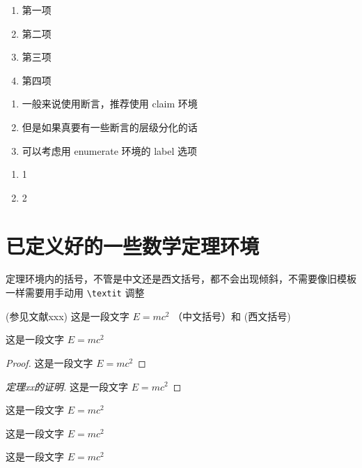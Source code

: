 \begin{enumerate}[I]
  \item 第一项
  \item 第二项
  \item 第三项
  \item 第四项
\end{enumerate}

\begin{enumerate}[label = \textbf{断言} \Alph*]
  \item 一般来说使用断言，推荐使用 claim 环境
  \item 但是如果真要有一些断言的层级分化的话
  \item 可以考虑用 enumerate 环境的 label 选项
\end{enumerate}

\begin{enumerate}[\textbf{断言} A]
  \item 1
  \item 2
\end{enumerate}


\section{已定义好的一些数学定理环境}

定理环境内的括号，不管是中文还是西文括号，都不会出现倾斜，不需要像旧模板一样需要用手动用 \verb|\textit| 调整
\begin{definition}[测度]
  (参见文献xxx) 这是一段文字 $E = m c^2$  （中文括号）和 (西文括号)
\end{definition}

\begin{theorem}
  这是一段文字 $E = m c^2$
\end{theorem}


\begin{proof}
  这是一段文字 $E = m c^2$
\end{proof}

\begin{proof}[定理xx的证明]
  这是一段文字 $E = m c^2$
\end{proof}

\begin{example}
  这是一段文字 $E = m c^2$
\end{example}

\begin{property}
  这是一段文字 $E = m c^2$
\end{property}

\begin{proposition}
  这是一段文字 $E = m c^2$
\end{proposition}

